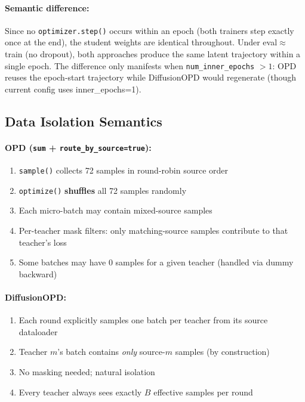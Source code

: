 \documentclass[11pt]{article}
\begin{document}
\paragraph{Semantic difference:}
Since no \texttt{optimizer.step()} occurs within an epoch (both trainers step exactly once at the end), the student weights are identical throughout. Under eval$\approx$train (no dropout), both approaches produce the same latent trajectory within a single epoch. The difference only manifests when \texttt{num\_inner\_epochs} $> 1$: OPD reuses the epoch-start trajectory while DiffusionOPD would regenerate (though current config uses inner\_epochs=1).

\subsection{Data Isolation Semantics}

\paragraph{OPD (\texttt{sum} + \texttt{route\_by\_source=true}):}
\begin{enumerate}[nosep]
    \item \texttt{sample()} collects 72 samples in round-robin source order
    \item \texttt{optimize()} \textbf{shuffles} all 72 samples randomly
    \item Each micro-batch may contain mixed-source samples
    \item Per-teacher mask filters: only matching-source samples contribute to that teacher's loss
    \item Some batches may have 0 samples for a given teacher (handled via dummy backward)
\end{enumerate}

\paragraph{DiffusionOPD:}
\begin{enumerate}[nosep]
    \item Each round explicitly samples one batch per teacher from its source dataloader
    \item Teacher $m$'s batch contains \emph{only} source-$m$ samples (by construction)
    \item No masking needed; natural isolation
    \item Every teacher always sees exactly $B$ effective samples per round
\end{enumerate}
\end{document}
